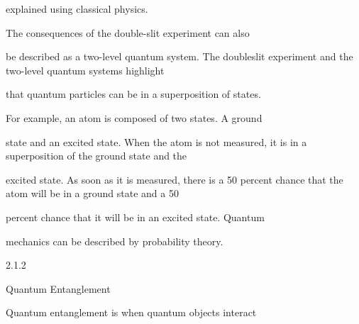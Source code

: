 \documentclass[a4paper,portrait,12pt]{article}
\begin{document}
\begin{flushleft}
explained using classical physics.
\end{flushleft}


\begin{flushleft}
The consequences of the double-slit experiment can also
\end{flushleft}


\begin{flushleft}
be described as a two-level quantum system. The doubleslit experiment and the two-level quantum systems highlight
\end{flushleft}


\begin{flushleft}
that quantum particles can be in a superposition of states.
\end{flushleft}


\begin{flushleft}
For example, an atom is composed of two states. A ground
\end{flushleft}


\begin{flushleft}
state and an excited state. When the atom is not measured, it is in a superposition of the ground state and the
\end{flushleft}


\begin{flushleft}
excited state. As soon as it is measured, there is a 50 percent chance that the atom will be in a ground state and a 50
\end{flushleft}


\begin{flushleft}
percent chance that it will be in an excited state. Quantum
\end{flushleft}


\begin{flushleft}
mechanics can be described by probability theory.
\end{flushleft}





2.1.2





\begin{flushleft}
Quantum Entanglement
\end{flushleft}





\begin{flushleft}
Quantum entanglement is when quantum objects interact
\end{flushleft}
\end{document}
